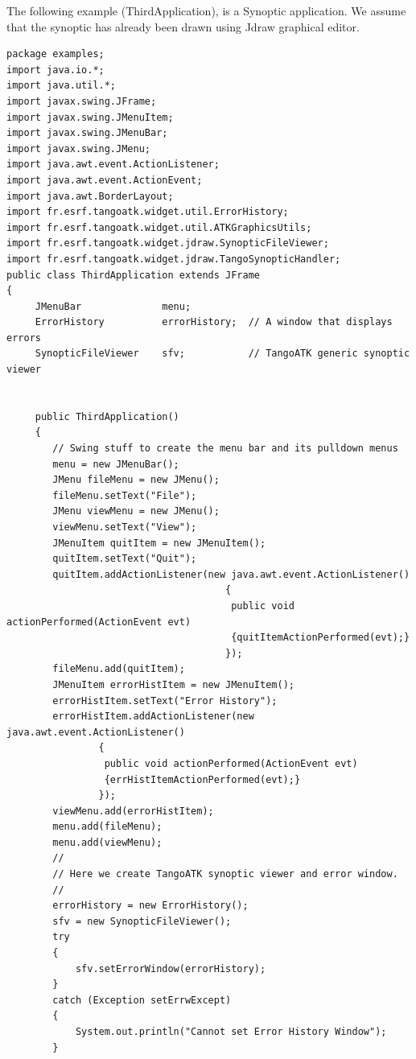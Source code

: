 The following example (ThirdApplication), is a Synoptic
application. We assume that the synoptic has already been drawn using
Jdraw graphical editor.


\begin{verbatim}
package examples;
import java.io.*;
import java.util.*;
import javax.swing.JFrame;
import javax.swing.JMenuItem;
import javax.swing.JMenuBar;
import javax.swing.JMenu;
import java.awt.event.ActionListener;
import java.awt.event.ActionEvent;
import java.awt.BorderLayout;
import fr.esrf.tangoatk.widget.util.ErrorHistory;
import fr.esrf.tangoatk.widget.util.ATKGraphicsUtils;
import fr.esrf.tangoatk.widget.jdraw.SynopticFileViewer;
import fr.esrf.tangoatk.widget.jdraw.TangoSynopticHandler;
public class ThirdApplication extends JFrame
{
     JMenuBar              menu;
     ErrorHistory          errorHistory;  // A window that displays errors
     SynopticFileViewer    sfv;           // TangoATK generic synoptic viewer
     
     
     public ThirdApplication()
     {
        // Swing stuff to create the menu bar and its pulldown menus
        menu = new JMenuBar();
        JMenu fileMenu = new JMenu();
        fileMenu.setText("File");   
        JMenu viewMenu = new JMenu();
        viewMenu.setText("View");
        JMenuItem quitItem = new JMenuItem();
        quitItem.setText("Quit");
        quitItem.addActionListener(new java.awt.event.ActionListener()
                                      {                 
                                       public void actionPerformed(ActionEvent evt)
                                       {quitItemActionPerformed(evt);}
                                      });
        fileMenu.add(quitItem);
        JMenuItem errorHistItem = new JMenuItem();
        errorHistItem.setText("Error History");
        errorHistItem.addActionListener(new java.awt.event.ActionListener()
                {                 
                 public void actionPerformed(ActionEvent evt)
                 {errHistItemActionPerformed(evt);}
                });
        viewMenu.add(errorHistItem);
        menu.add(fileMenu);
        menu.add(viewMenu);
        //
        // Here we create TangoATK synoptic viewer and error window.
        //
        errorHistory = new ErrorHistory();
        sfv = new SynopticFileViewer();
        try
        {
            sfv.setErrorWindow(errorHistory);
        }
        catch (Exception setErrwExcept)
        {
            System.out.println("Cannot set Error History Window");
        }


\end{verbatim}

